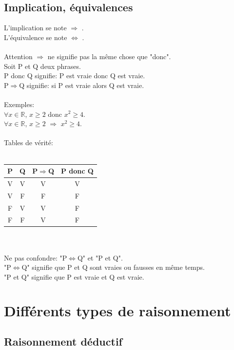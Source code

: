 \documentclass[a4paper,french,12pt]{article}
\begin{document}
\subsection{Implication, équivalences}
\vspace{0.1cm}
\noindent
L'implication se note $\Rightarrow$ .\\
L'équivalence se note $\Leftrightarrow$ .\\
\\
Attention $\Rightarrow$ ne signifie pas la même chose que "donc".\\
Soit P et Q deux phrases.\\
P donc Q signifie: P est vraie donc Q est vraie.\\
P$\Rightarrow$Q signifie: si P est vraie alors Q est vraie.\\
\\
Exemples:\\
$\forall x \in \mathbb{R}$, $x\geq 2$ donc $x^2 \geq 4$.\\
$\forall x \in \mathbb{R}$, $x \geq 2$ $\Rightarrow$ $x^2 \geq 4$.\\
\\
Tables de vérité:\\
\\
\begin{tabular}{|c|c|c|c|}
\hline
P & Q & P$\Rightarrow$Q & P donc Q\\
\hline
V & V & V & V\\
\hline
V & F & F & F\\
\hline
F & V & V & F\\
\hline
F & F & V & F\\
\hline
\end{tabular}
\\
\\
Ne pas confondre: "P$\Leftrightarrow$Q" et "P et Q".\\
"P$\Leftrightarrow$Q" signifie que P et Q sont vraies ou fausses en même temps.\\
"P et Q" signifie que P est vraie et Q est vraie.

\section{Différents types de raisonnement}

\subsection{Raisonnement déductif}
\end{document}
